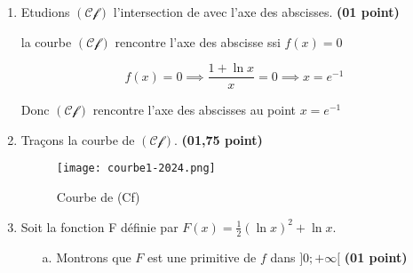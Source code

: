 \documentclass[12pt]{article}
\begin{document}
\begin{enumerate}
\begin{itemize}
$$\ln x \leq 0\implies x\in]0; 1]$$

$$\textcolor{green}{\boxed{S=]0; 1]}}$$
\item[b.] Montrons que la dérivée de $f$ est définie pour tout $x>0$, par $f'(x)=\frac{-\ln x}{x^{2}}$ \textbf{(0,5 point)}
$$ f(x)=\frac{1+\ln x}{x} $$
$$ f'(x)=\frac{(1+\ln x)'x+(1+\ln x)x'}{x^{2}}=\frac{1-(1+\ln x)}{x^{2}}=\frac{-\ln x}{x^{2}} $$
$$ \text{Donc }f'(x)=\frac{-\ln x}{x^{2}} \text{Cqfd } $$
Etudions son signe.\textbf{(0,5 point)}

Le signe de $f$ dépend du numérateur car $x^{2}>0$ or 

$\forall x\in]0; 1]$, $\ln x <0\implies -\ln x >0$ donc $\forall x\in]0; 1], f'(x)\geq 0$

$\forall x\in[1; +\infty[$, $\ln x >0\implies -\ln x <0$ donc $\forall x\in]1; +\infty[, f'(x)\leq 0$
\newpage
\textbf{En résumé}
\textcolor{green}{
\begin{itemize}
\item $\forall x\in]0; 1], f'(x)\geq 0$ donc f est décroissante
\item $\forall x\in]1; +\infty[, f'(x)\leq 0$ donc f est croissante
\end{itemize}
}
\item[c.] Dressons le tableau de variation de $f$ \textbf{(01 point)}

\end{itemize}
\item Etudions $(\mathscr{Cf})$ l'intersection de avec l'axe des abscisses. \textbf{(01 point)}

la courbe $(\mathscr{Cf})$ rencontre l'axe des abscisse ssi $f(x)=0$

$$ f(x)=0\implies \frac{1+\ln x}{x}=0\implies x=e^{-1} $$

Donc $(\mathscr{Cf})$ rencontre l'axe des abscisses au point $x=e^{-1}$

\item Traçons la courbe de $(\mathscr{Cf})$.  \textbf{(01,75 point)}
\begin{figure}[h]
\centering
\texttt{[image: courbe1-2024.png]}
\caption{Courbe de (Cf)}
\label{fig:monimage}
\end{figure}
\item Soit  la fonction F définie par $F(x)=\frac{1}{2}(\ln x)^{2}+\ln x.$
\begin{itemize}
\item[a.] Montrons que $F$ est une primitive de $f$ dans $]0; +\infty[$ \textbf{(01 point)}


\end{itemize}
\end{enumerate}
\end{document}

